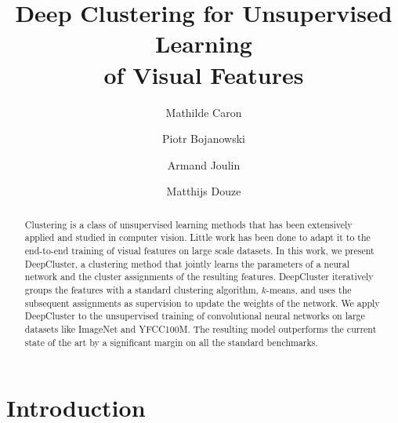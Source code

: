 \documentclass[runningheads]{llncs}
\makeatletter
\DeclareRobustCommand\onedot{\futurelet\@let@token\@onedot}
\def\@onedot{\ifx\@let@token.\else.\null\fi\xspace}
\def\etal{\emph{et al}\onedot}
\def\OURS{DeepCluster\xspace}
\makeatother
\begin{document}
\pagestyle{headings}
\mainmatter
\def\ECCV18SubNumber{1370}  %


\title{Deep Clustering for Unsupervised Learning \\  of Visual Features} %


\authorrunning{Mathilde Caron \etal}

\author{Mathilde Caron \and Piotr Bojanowski \and Armand Joulin \and Matthijs Douze}


\maketitle

\begin{abstract}
  Clustering is a class of unsupervised learning methods that has been extensively applied and studied in computer vision.
  Little work has been done to adapt it to the end-to-end training of visual features on large scale datasets.
  In this work, we present \OURS, a clustering method that jointly learns the parameters of a neural network and the cluster assignments
  of the resulting features.
  \OURS iteratively groups the features with a standard clustering algorithm, $k$-means, and uses the subsequent assignments as supervision
  to update the weights of the network.
  We apply \OURS to the unsupervised training of convolutional neural networks on large datasets like ImageNet and YFCC100M.
  The resulting model outperforms the current state of the art by a significant margin on all the standard benchmarks.
\end{abstract}

\section{Introduction}


\end{document}
